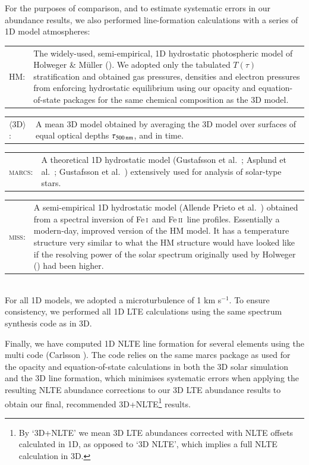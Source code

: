 \documentclass[traditabstract]{aa}
\newcommand{\oneDAV}{$\langle\mathrm{3D}\rangle$}
\newcommand{\marcs}{\textsc{marcs}}
\newcommand{\miss}{\textsc{miss}}
\newcommand{\altfei}{Fe\,\textsc{i}}
\newcommand{\altfeii}{Fe\,\textsc{ii}}
\newcommand{\fei}{\altfei\ }
\newcommand{\feii}{\altfeii\ }
\begin{document}
For the purposes of comparison, and to estimate systematic errors in our abundance results, we also performed line-formation calculations with a series of 1D model atmospheres:\\
\begin{tabular}{p{1cm}p{7cm}}
HM: & The widely-used, semi-empirical, 1D hydrostatic photospheric model of Holweger \& M\"{u}ller (\cite{holm}). We adopted only the tabulated $T(\tau)$ stratification and obtained gas pressures, densities and electron pressures from enforcing hydrostatic equilibrium using our opacity and equation-of-state packages for the same chemical composition as the 3D model.\\
\end{tabular}
\begin{tabular}{p{1cm}p{7cm}}
\oneDAV: & A mean 3D model obtained by averaging the 3D model over surfaces of equal optical depths $\tau_{500\,{\rm nm}}$, and in time.\\  
\end{tabular}
\begin{tabular}{p{1cm}p{7cm}}
\marcs: & A theoretical 1D hydrostatic model (Gustafsson et al.\ \cite{bgus:atmgrid}; Asplund et al.\ \cite{asp0}; Gustafsson et al.\ \cite{marcs08}) extensively used for analysis of solar-type stars.\\
\end{tabular}
\begin{tabular}{p{1cm}p{7cm}}
\miss: & A semi-empirical 1D hydrostatic model (Allende Prieto et al.\ \cite{alle}) obtained from a spectral inversion of \fei and \feii line profiles. Essentially a modern-day, improved version of the HM model. It has a temperature structure very similar to what the HM structure would have looked like if the resolving power of the solar spectrum originally used by Holweger (\cite{hol0}) had been higher. 
\end{tabular}\\
For all 1D models, we adopted a microturbulence of 1 km s$^{-1}$. To ensure consistency, we performed all 1D LTE calculations using the same spectrum synthesis code as in 3D. 

Finally, we have computed 1D NLTE line formation for several elements using the {\sc multi} code (Carlsson \cite{multi}). The code relies on the same {\sc marcs} package as used for the opacity and equation-of-state calculations in both the 3D solar simulation and the 3D line formation, which minimises systematic errors when applying the resulting NLTE abundance corrections to our 3D LTE abundance results to obtain our final, recommended 3D+NLTE\footnote{By `3D+NLTE' we mean 3D LTE abundances corrected with NLTE offsets calculated in 1D, as opposed to `3D NLTE', which implies a full NLTE calculation in 3D.} results.
\end{document}
